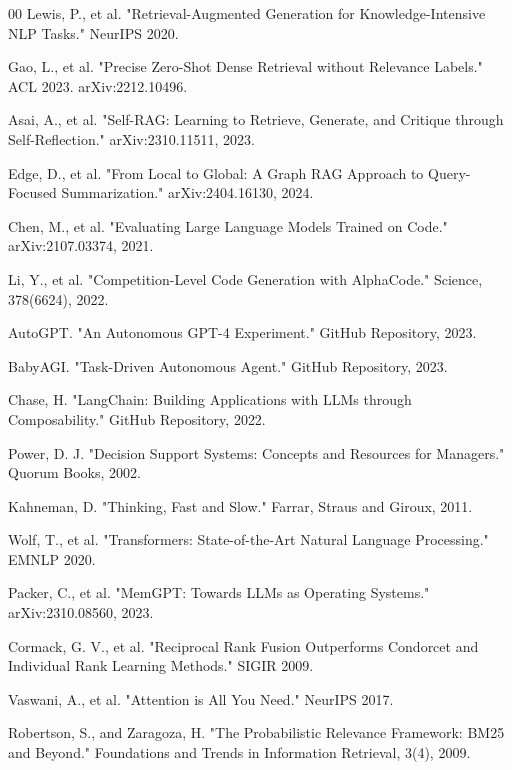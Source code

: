 \documentclass[conference]{IEEEtran}
\begin{document}
\begin{thebibliography}{00}
 Lewis, P., et al. "Retrieval-Augmented Generation for Knowledge-Intensive NLP Tasks." NeurIPS 2020.

 Gao, L., et al. "Precise Zero-Shot Dense Retrieval without Relevance Labels." ACL 2023. arXiv:2212.10496.

 Asai, A., et al. "Self-RAG: Learning to Retrieve, Generate, and Critique through Self-Reflection." arXiv:2310.11511, 2023.

 Edge, D., et al. "From Local to Global: A Graph RAG Approach to Query-Focused Summarization." arXiv:2404.16130, 2024.

 Chen, M., et al. "Evaluating Large Language Models Trained on Code." arXiv:2107.03374, 2021.

 Li, Y., et al. "Competition-Level Code Generation with AlphaCode." Science, 378(6624), 2022.

 AutoGPT. "An Autonomous GPT-4 Experiment." GitHub Repository, 2023.

 BabyAGI. "Task-Driven Autonomous Agent." GitHub Repository, 2023.

 Chase, H. "LangChain: Building Applications with LLMs through Composability." GitHub Repository, 2022.

 Power, D. J. "Decision Support Systems: Concepts and Resources for Managers." Quorum Books, 2002.

 Kahneman, D. "Thinking, Fast and Slow." Farrar, Straus and Giroux, 2011.

 Wolf, T., et al. "Transformers: State-of-the-Art Natural Language Processing." EMNLP 2020.

 Packer, C., et al. "MemGPT: Towards LLMs as Operating Systems." arXiv:2310.08560, 2023.

 Cormack, G. V., et al. "Reciprocal Rank Fusion Outperforms Condorcet and Individual Rank Learning Methods." SIGIR 2009.

 Vaswani, A., et al. "Attention is All You Need." NeurIPS 2017.

 Robertson, S., and Zaragoza, H. "The Probabilistic Relevance Framework: BM25 and Beyond." Foundations and Trends in Information Retrieval, 3(4), 2009.


\end{thebibliography}
\end{document}
